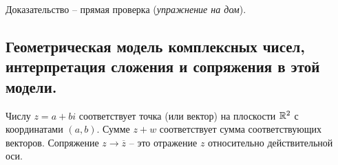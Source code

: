 Доказательство -- прямая проверка (\textit{упражнение на дом}).

\subsection{Геометрическая модель комплексных чисел, интерпретация сложения и сопряжения в этой модели.}

Числу $z = a + bi$ соответствует точка (или вектор) на плоскости $\mathbb{R}^2$ с координатами $(a, b)$.
Сумме $z + w$ соответствует сумма соответствующих векторов.
Сопряжение $z \to \overline{z}$ -- это отражение $z$ относительно действительной оси.
